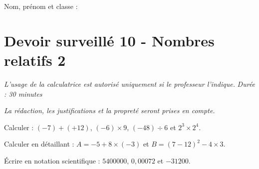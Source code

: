 \documentclass[a4paper,10pt]{report}
\begin{document}
\pagestyle{empty}
\noindent Nom, prénom et classe : \dotfill

\section*{Devoir surveillé 10 - Nombres relatifs 2}

\noindent \textit{L'usage de la calculatrice est autorisé uniquement si le professeur l'indique.} \hfill \textit{Durée : 30 minutes}

\medskip
\noindent \textit{La rédaction, les justifications et la propreté seront prises en compte.}


\begin{ex}[Calculs]
Calculer : $(-7)+(+12)$, $(-6)\times 9$, $(-48)\div 6$ et $2^3\times2^4$.
\medskip\noindent\grandscarreaux{\linewidth}{4cm}
\end{ex}
\begin{ex}[Priorités]
Calculer en détaillant : $A=-5+8\times(-3)$ et $B=(7-12)^2-4\times3$.
\medskip\noindent\grandscarreaux{\linewidth}{4cm}
\end{ex}
\begin{ex}
Écrire en notation scientifique : $5400000$, $0,00072$ et $-31200$.
\medskip\noindent\grandscarreaux{\linewidth}{3cm}
\end{ex}
\end{document}
